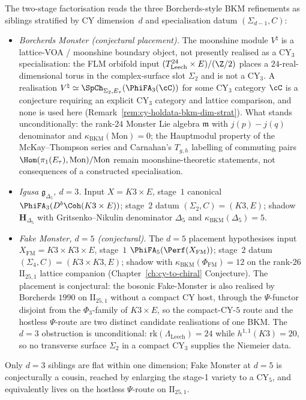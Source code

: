 \begin{remark}
\label{rem:dim-stratified-siblings}
The two-stage factorisation reads the three Borcherds-style
BKM refinements as siblings stratified by CY dimension~$d$ and
specialisation datum $(\Sigma_{d-1}, C)$:
\begin{itemize}[leftmargin=1.5em,topsep=0.3ex,itemsep=0.3ex]
\item \emph{Borcherds Monster (conjectural placement).} The
 moonshine module $V^\natural$ is a lattice-VOA / moonshine boundary
 object, not presently realised as a CY$_3$ specialisation: the FLM
 orbifold input $(T^{24}_{\mathrm{Leech}} \times E)/(\Z/2)$ places a
 $24$-real-dimensional torus in the complex-surface slot
 $\Sigma_2$ and is not a CY$_3$. A realisation
 $V^\natural \simeq \SpCh_{\Sigma_2, E_\tau}(\PhiFA_3(\cC))$ for
 some CY$_3$ category $\cC$ is a conjecture requiring an explicit
 CY$_3$ category and lattice comparison, and none is used here
 (Remark~\ref{rem:cy-holdata-bkm-dim-strat}). What stands
 unconditionally: the rank-$24$ Monster Lie algebra $\mathfrak m$
 with $j(p) - j(q)$ denominator and
 $\kappa_{\mathrm{BKM}}(\mathrm{Mon}) = 0$; the Hauptmodul property
 of the McKay--Thompson series and Carnahan's $T_{g, h}$ labelling of
 commuting pairs $\Hom(\pi_1(E_\tau), \mathrm{Mon})/\mathrm{Mon}$
 remain moonshine-theoretic statements, not consequences of a
 constructed specialisation.
\item \emph{Igusa $\mathfrak{g}_{\Delta_5}$, $d = 3$.} Input
 $X = K3 \times E$, stage~$1$ canonical
 $\PhiFA_3(D^b\Coh(K3\times E))$; stage~$2$ datum
 $(\Sigma_2, C) = (K3, E)$; shadow $\mathbf{H}_{\Delta_5}$ with
 Gritsenko--Nikulin denominator $\Delta_5$ and
 $\kappa_{\mathrm{BKM}}(\Delta_5) = 5$.
\item \emph{Fake Monster, $d = 5$ (conjectural).} The
 $d = 5$ placement hypothesises input
 $X_{\mathrm{FM}} = K3 \times K3 \times E$, stage~$1$
 $\PhiFA_5(\Perf(X_{\mathrm{FM}}))$; stage~$2$ datum
 $(\Sigma_4, C) = (K3 \times K3, E)$; shadow with
 $\kappa_{\mathrm{BKM}}(\Phi_{\mathrm{FM}}) = 12$ on the
 rank-$26$ $\mathrm{II}_{25, 1}$ lattice companion
 (Chapter~\ref{ch:cy-to-chiral} Conjecture). The placement is
 conjectural: the bosonic Fake-Monster is also realised by
 Borcherds $1990$ on $\mathrm{II}_{25,1}$ without a compact
 CY host, through the $\Psi$-functor disjoint from the
 $\Phi_3$-family of $K3 \times E$, so the compact-CY-$5$
 route and the hostless $\Psi$-route are two distinct
 candidate realisations of one BKM. The $d = 3$ obstruction
 is unconditional: $\mathrm{rk}(\Lambda_{\mathrm{Leech}}) = 24$
 while $h^{1, 1}(K3) = 20$, so no transverse surface
 $\Sigma_2$ in a compact CY$_3$ supplies the Niemeier data.
\end{itemize}
Only $d = 3$ siblings are flat within one dimension; Fake
Monster at $d = 5$ is conjecturally a cousin, reached by
enlarging the stage-1 variety to a CY$_5$, and equivalently
lives on the hostless $\Psi$-route on $\mathrm{II}_{25, 1}$.
\end{remark}

